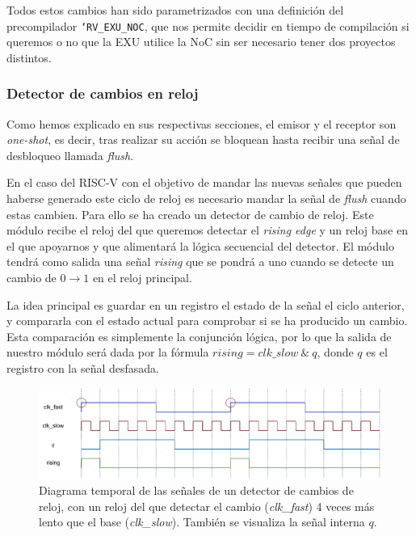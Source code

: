 Todos estos cambios han sido parametrizados con una definición del precompilador \texttt{`RV\_EXU\_NOC}, que nos permite decidir en tiempo de compilación si queremos o no que la EXU utilice la NoC sin ser necesario tener dos proyectos distintos.

\subsubsection{Detector de cambios en reloj}

Como hemos explicado en sus respectivas secciones, el emisor y el receptor son \textit{one-shot}, es decir, tras realizar su acción se bloquean hasta recibir una señal de desbloqueo llamada \textit{flush}.

En el caso del RISC-V con el objetivo de mandar las nuevas señales que pueden haberse generado este ciclo de reloj es necesario mandar la señal de \textit{flush} cuando estas cambien. Para ello se ha creado un detector de cambio de reloj. Este módulo recibe el reloj del que queremos detectar el \textit{rising edge} y un reloj base en el que apoyarnos y que alimentará la lógica secuencial del detector. El módulo tendrá como salida una señal \textit{rising} que se pondrá a uno cuando se detecte un cambio de $0\rightarrow1$ en el reloj principal.

La idea principal es guardar en un registro el estado de la señal el ciclo anterior, y compararla con el estado actual para comprobar si se ha producido un cambio. Esta comparación es simplemente la conjunción lógica, por lo que la salida de nuestro módulo será dada por la fórmula $rising = clk\_slow\ \& ~q$, donde $q$ es el registro con la señal desfasada.

\begin{figure}[h]
    \centering
    \includegraphics[width=\textwidth]{images/diagrams/edge_detector.drawio.pdf}
    \caption[Diagrama temporal de las señales de un detector de cambios de reloj.]{Diagrama temporal de las señales de un detector de cambios de reloj, con un reloj del que detectar el cambio (\textit{clk\_fast}) 4 veces más lento que el base (\textit{clk\_slow}). También se visualiza la señal interna $q$.}
    \label{fig:signals_edge_detector}
\end{figure}